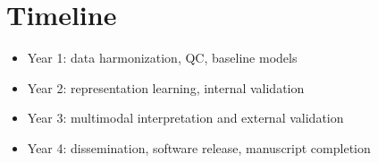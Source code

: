 \section{Timeline}

\begin{itemize}
  \item Year 1: data harmonization, QC, baseline models
  \item Year 2: representation learning, internal validation
  \item Year 3: multimodal interpretation and external validation
  \item Year 4: dissemination, software release, manuscript completion
\end{itemize}
